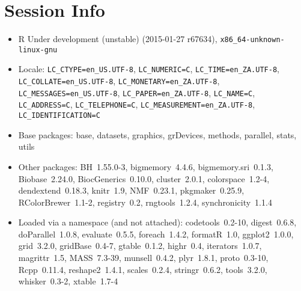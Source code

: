 \documentclass[a4paper]{article}\usepackage[]{graphicx}\usepackage[]{color}
\begin{document}
\section{Session Info}
\begin{itemize}\raggedright
  \item R Under development (unstable) (2015-01-27 r67634), \verb|x86_64-unknown-linux-gnu|
  \item Locale: \verb|LC_CTYPE=en_US.UTF-8|, \verb|LC_NUMERIC=C|, \verb|LC_TIME=en_ZA.UTF-8|, \verb|LC_COLLATE=en_US.UTF-8|, \verb|LC_MONETARY=en_ZA.UTF-8|, \verb|LC_MESSAGES=en_US.UTF-8|, \verb|LC_PAPER=en_ZA.UTF-8|, \verb|LC_NAME=C|, \verb|LC_ADDRESS=C|, \verb|LC_TELEPHONE=C|, \verb|LC_MEASUREMENT=en_ZA.UTF-8|, \verb|LC_IDENTIFICATION=C|
  \item Base packages: base, datasets, graphics, grDevices,
    methods, parallel, stats, utils
  \item Other packages: BH~1.55.0-3, bigmemory~4.4.6,
    bigmemory.sri~0.1.3, Biobase~2.24.0, BiocGenerics~0.10.0,
    cluster~2.0.1, colorspace~1.2-4, dendextend~0.18.3, knitr~1.9,
    NMF~0.23.1, pkgmaker~0.25.9, RColorBrewer~1.1-2, registry~0.2,
    rngtools~1.2.4, synchronicity~1.1.4
  \item Loaded via a namespace (and not attached):
    codetools~0.2-10, digest~0.6.8, doParallel~1.0.8,
    evaluate~0.5.5, foreach~1.4.2, formatR~1.0, ggplot2~1.0.0,
    grid~3.2.0, gridBase~0.4-7, gtable~0.1.2, highr~0.4,
    iterators~1.0.7, magrittr~1.5, MASS~7.3-39, munsell~0.4.2,
    plyr~1.8.1, proto~0.3-10, Rcpp~0.11.4, reshape2~1.4.1,
    scales~0.2.4, stringr~0.6.2, tools~3.2.0, whisker~0.3-2,
    xtable~1.7-4
\end{itemize}


\printbibliography[heading=bibintoc]
\end{document}
